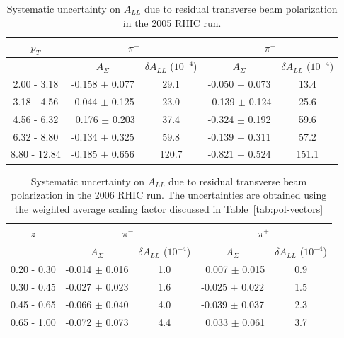 \begin{table}
  \centering
  \begin{tabular}{c||c|c||c|c}
    $p_{T}$ & \multicolumn{2}{c||}{$\pi^{-}$} & \multicolumn{2}{c}{$\pi^{+}$} \\
    \hline
    & $A_{\Sigma}$ & $\delta A_{LL}$ ($10^{-4}$) & $A_{\Sigma}$ & $\delta A_{LL}$ ($10^{-4}$) \\
    \hline
    2.00 - 3.18  & -0.158 $\pm$ 0.077 & 29.1  & -0.050 $\pm$ 0.073 & 13.4  \\
    3.18 - 4.56  & -0.044 $\pm$ 0.125 & 23.0  & ~0.139 $\pm$ 0.124 & 25.6  \\
    4.56 - 6.32  & ~0.176 $\pm$ 0.203 & 37.4  & -0.324 $\pm$ 0.192 & 59.6  \\
    6.32 - 8.80  & -0.134 $\pm$ 0.325 & 59.8  & -0.139 $\pm$ 0.311 & 57.2  \\
    8.80 - 12.84 & -0.185 $\pm$ 0.656 & 120.7 & -0.821 $\pm$ 0.524 & 151.1
  \end{tabular}
  \caption{Systematic uncertainty on $A_{LL}$ due to residual transverse beam polarization in the 2005 RHIC run.}
  \label{tab:syst-pol-2005}
\end{table}

\begin{table}
  \centering
  \begin{tabular}{c||c|c||c|c}
    $z$ & \multicolumn{2}{c||}{$\pi^{-}$} & \multicolumn{2}{c}{$\pi^{+}$} \\
    \hline
    & $A_{\Sigma}$ & $\delta A_{LL}$ ($10^{-4}$) & $A_{\Sigma}$ & $\delta A_{LL}$ ($10^{-4}$) \\
    \hline
    0.20 - 0.30 & -0.014 $\pm$ 0.016 & 1.0 & ~0.007 $\pm$ 0.015 & 0.9 \\
    0.30 - 0.45 & -0.027 $\pm$ 0.023 & 1.6 & -0.025 $\pm$ 0.022 & 1.5 \\
    0.45 - 0.65 & -0.066 $\pm$ 0.040 & 4.0 & -0.039 $\pm$ 0.037 & 2.3 \\
    0.65 - 1.00 & -0.072 $\pm$ 0.073 & 4.4 & ~0.033 $\pm$ 0.061 & 3.7
  \end{tabular}
  \caption{Systematic uncertainty on $A_{LL}$ due to residual transverse beam polarization in the 2006 RHIC run.  The uncertainties are obtained using the weighted average scaling factor discussed in Table~\ref{tab:pol-vectors}}
  \label{tab:syst-pol-2006}
\end{table}

